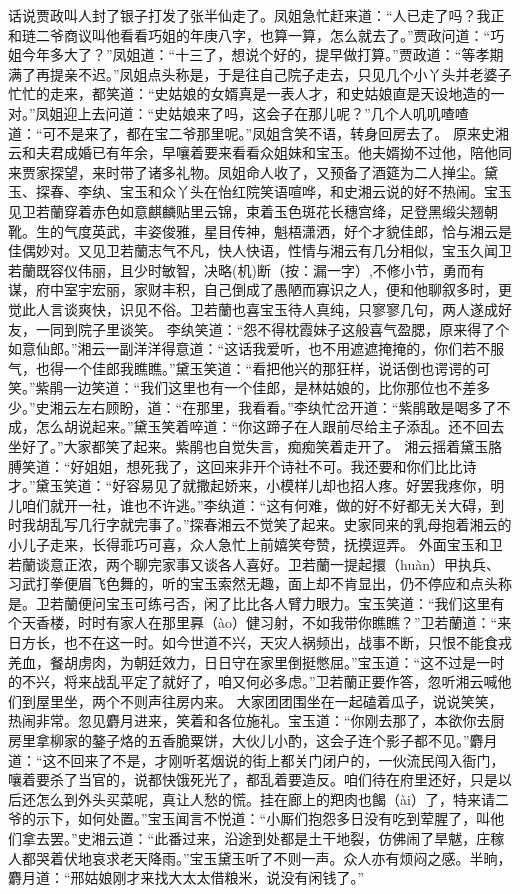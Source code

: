 \documentclass[12pt,oneside]{book}
\begin{document}
话说贾政叫人封了银子打发了张半仙走了。凤姐急忙赶来道：“人已走了吗？我正和琏二爷商议叫他看看巧姐的年庚八字，也算一算，怎么就去了。”贾政问道：“巧姐今年多大了？”凤姐道：“十三了，想说个好的，提早做打算。”贾政道：“等孝期满了再提亲不迟。”凤姐点头称是，于是往自己院子走去，只见几个小丫头并老婆子忙忙的走来，都笑道：“史姑娘的女婿真是一表人才，和史姑娘直是天设地造的一对。”凤姐迎上去问道：“史姑娘来了吗，这会子在那儿呢？”几个人叽叽喳喳道：“可不是来了，都在宝二爷那里呢。”凤姐含笑不语，转身回房去了。
原来史湘云和夫君成婚已有年余，早嚷着要来看看众姐妹和宝玉。他夫婿拗不过他，陪他同来贾家探望，来时带了诸多礼物。凤姐命人收了，又预备了酒筵为二人掸尘。黛玉、探春、李纨、宝玉和众丫头在怡红院笑语喧哗，和史湘云说的好不热闹。宝玉见卫若蘭穿着赤色如意麒麟贴里云锦，束着玉色斑花长穗宫绛，足登黑缎尖翘朝靴。生的气度英武，丰姿俊雅，星目传神，魁梧潇洒，好个才貌佳郎，恰与湘云是佳偶妙对。又见卫若蘭志气不凡，快人快语，性情与湘云有几分相似，宝玉久闻卫若蘭既容仪伟丽，且少时敏智，决略(机)断（按：漏一字）,不修小节，勇而有谋，府中室宇宏丽，家财丰积，自己倒成了愚陋而寡识之人，便和他聊叙多时，更觉此人言谈爽快，识见不俗。卫若蘭也喜宝玉待人真纯，只寥寥几句，两人遂成好友，一同到院子里谈笑。
李纨笑道：“怨不得枕霞妹子这般喜气盈腮，原来得了个如意仙郎。”湘云一副洋洋得意道：“这话我爱听，也不用遮遮掩掩的，你们若不服气，也得一个佳郎我瞧瞧。”黛玉笑道：“看把他兴的那狂样，说话倒也谔谔的可笑。”紫鹃一边笑道：“我们这里也有一个佳郎，是林姑娘的，比你那位也不差多少。”史湘云左右顾盼，道：“在那里，我看看。”李纨忙岔开道：“紫鹃敢是喝多了不成，怎么胡说起来。”黛玉笑着啐道：“你这蹄子在人跟前尽给主子添乱。还不回去坐好了。”大家都笑了起来。紫鹃也自觉失言，痴痴笑着走开了。
湘云摇着黛玉胳膊笑道：“好姐姐，想死我了，这回来非开个诗社不可。我还要和你们比比诗才。”黛玉笑道：“好容易见了就撒起娇来，小模样儿却也招人疼。好罢我疼你，明儿咱们就开一社，谁也不许逃。”李纨道：“这有何难，做的好不好都无关大碍，到时我胡乱写几行字就完事了。”探春湘云不觉笑了起来。史家同来的乳母抱着湘云的小儿子走来，长得乖巧可喜，众人急忙上前嬉笑夸赞，抚摸逗弄。
外面宝玉和卫若蘭谈意正浓，两个聊完家事又谈各人喜好。卫若蘭一提起擐（huàn）甲执兵、习武打拳便眉飞色舞的，听的宝玉索然无趣，面上却不肯显出，仍不停应和点头称是。卫若蘭便问宝玉可练弓否，闲了比比各人臂力眼力。宝玉笑道：“我们这里有个天香楼，时时有家人在那里奡（ào）健习射，不如我带你瞧瞧？”卫若蘭道：“来日方长，也不在这一时。如今世道不兴，天灾人祸频出，战事不断，只恨不能食戎羌血，餐胡虏肉，为朝廷效力，日日守在家里倒挺憋屈。”宝玉道：“这不过是一时的不兴，将来战乱平定了就好了，咱又何必多虑。”卫若蘭正要作答，忽听湘云喊他们到屋里坐，两个不则声往房内来。
大家团团围坐在一起磕着瓜子，说说笑笑，热闹非常。忽见麝月进来，笑着和各位施礼。宝玉道：“你刚去那了，本欲你去厨房里拿柳家的鏊子烙的五香脆粟饼，大伙儿小酌，这会子连个影子都不见。”麝月道：“这不回来了不是，才刚听茗烟说的街上都关门闭户的，一伙流民闯入衙门，嚷着要杀了当官的，说都快饿死光了，都乱着要造反。咱们待在府里还好，只是以后还怎么到外头买菜呢，真让人愁的慌。挂在廊上的羓肉也餲（ài）了，特来请二爷的示下，如何处置。”宝玉闻言不悦道：“小厮们抱怨多日没有吃到荤腥了，叫他们拿去罢。”史湘云道：“此番过来，沿途到处都是土干地裂，仿佛闹了旱魃，庄稼人都哭着伏地哀求老天降雨。”宝玉黛玉听了不则一声。众人亦有烦闷之感。半晌，麝月道：“邢姑娘刚才来找大太太借粮米，说没有闲钱了。”
\end{document}
